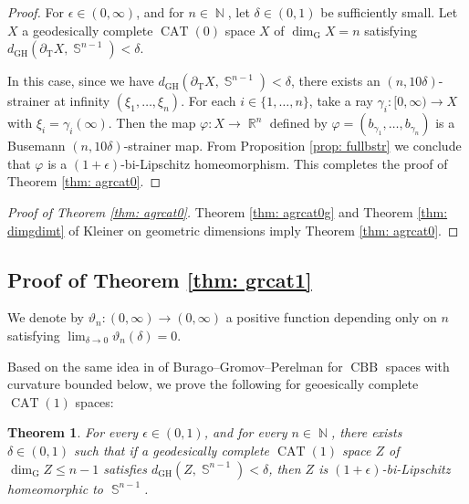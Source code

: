 \documentclass[a4paper,12pt]{amsart}
\newcommand{\CAT}{\operatorname{CAT}}
\newcommand{\CBB}{\operatorname{CBB}}
\newcommand{\R}{\operatorname{\mathbb{R}}}
\newcommand{\N}{\operatorname{\mathbb{N}}}
\newcommand{\Sph}{\operatorname{\mathbb{S}}}
\newcommand{\GH}{\operatorname{\mathrm{GH}}}
\numberwithin{equation}{section}
\theoremstyle{plain}
\newtheorem{thm}{Theorem}[section]
\theoremstyle{definition}
\theoremstyle{remark}
\begin{document}
\begin{proof}
For $\epsilon \in (0,\infty)$,
and for $n \in \N$,
let $\delta \in (0,1)$ be sufficiently small.
Let $X$ a geodesically complete $\CAT(0)$ space $X$
of $\dim_{\mathrm{G}}X = n$
satisfying
$d_{\GH} \left( \partial_{\mathrm{T}}X, \Sph^{n-1} \right) < \delta$.

In this case,
since we have 
$d_{\GH} \left( \partial_{\mathrm{T}}X, \Sph^{n-1} \right) < \delta$,
there exists an $(n,10\delta)$-strainer at infinity
$\left( \xi_1, \dots, \xi_n \right)$.
For each $i \in \{ 1, \dots, n \}$,
take a ray $\gamma_i \colon [0,\infty) \to X$
with $\xi_i = \gamma_i(\infty)$.
Then the map $\varphi \colon X \to \R^n$
defined by $\varphi = \left( b_{\gamma_1}, \dots, b_{\gamma_n} \right)$
is a Busemann $(n,10\delta)$-strainer map.
From Proposition \ref{prop: fullbstr}
we conclude that 
$\varphi$ is a $(1+\epsilon)$-bi-Lipschitz homeomorphism.
This completes the proof of Theorem \ref{thm: agrcat0}.
\end{proof}

\begin{proof}[Proof of Theorem \ref{thm: agrcat0}]
Theorem \ref{thm: agrcat0g}
and Theorem \ref{thm: dimgdimt} of Kleiner \cite{kleiner}
on geometric dimensions
imply Theorem \ref{thm: agrcat0}.
\end{proof}

\subsection{Proof of Theorem \ref{thm: grcat1}}

We denote by $\vartheta_n \colon (0,\infty) \to (0,\infty)$ 
a positive function
depending only on $n$
satisfying $\lim_{\delta \to 0} \vartheta_n(\delta) = 0$.

Based on the same idea in \cite[Theorem 9.5]{burago-gromov-perelman}
of Burago--Gromov--Perelman
for $\CBB$ spaces
with curvature bounded below,
we prove the following
for geoesically complete $\CAT(1)$ spaces:

\begin{thm}
\label{thm: grcat1g}
For every $\epsilon \in (0,1)$,
and for every $n \in \N$,
there exists $\delta \in (0,1)$ such that
if a geodesically complete $\CAT(1)$ space $Z$
of $\dim_{\mathrm{G}} Z \le n-1$ satisfies
$d_{\GH} \left( Z, \Sph^{n-1} \right) < \delta$,
then $Z$ is $(1+\epsilon)$-bi-Lipschitz homeomorphic to $\Sph^{n-1}$.
\end{thm}
\end{document}
